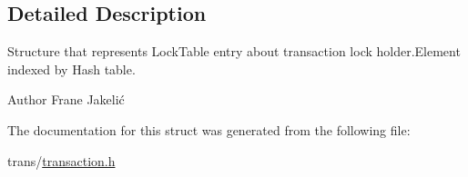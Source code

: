 \subsection{Detailed Description}
Structure that represents Lock\+Table entry about transaction lock holder.\+Element indexed by Hash table. 

\begin{DoxyAuthor}{Author}
Frane Jakelić 
\end{DoxyAuthor}


The documentation for this struct was generated from the following file\+:\begin{DoxyCompactItemize}
\item 
trans/\hyperlink{transaction_8h}{transaction.\+h}\end{DoxyCompactItemize}
